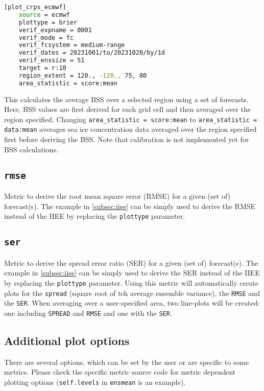 \documentclass[DIV=10, parskip=full]{scrreprt}
\newcommand{\notimplement}[1]{#1}
\begin{document}
\begin{lstlisting}[language=bash]
	[plot_crps_ecmwf]
	source = ecmwf
	plottype = brier
	verif_expname = 0001
	verif_mode = fc
	verif_fcsystem = medium-range
	verif_dates = 20231001/to/20231020/by/1d
	verif_enssize = 51
	target = r:10
	region_extent = 120., -120., 75, 80
	area_statistic = score:mean
\end{lstlisting}
This calculates the average BSS over a selected region using a set of forecasts. Here, BSS values are first derived for each grid cell and then averaged over the region specified. Changing \texttt{area\_statistic = score:mean} to \texttt{area\_statistic = data:mean}  averages sea ice concentration data averaged over the region specified first before deriving the BSS.  \notimplement{Note that calibration is not implemented yet for BSS calculations.}


\subsection{\texttt{rmse}}
Metric to derive the root mean square error (RMSE) for a given (set of) forecast(s). The example in \ref{subsec:iiee} can be simply used to derive the RMSE instead of the IIEE by replacing the \texttt{plottype} parameter. 

\subsection{\texttt{ser}}
Metric to derive the spread error ratio (SER) for a given (set of) forecast(s). The example in \ref{subsec:iiee} can be simply used to derive the SER instead of the IIEE by replacing the \texttt{plottype} parameter. Using this metric will automatically create plots for the \texttt{spread} (square root of teh average ensemble variance), the \texttt{RMSE} and the \texttt{SER}. When averaging over a user-specified area, two line-plots will be created: one including \texttt{SPREAD} and \texttt{RMSE} and one with the \texttt{SER}.



\subsection{Additional plot options}\label{subsec:add_options}
There are several options, which can be set by the user or are specific to some metrics. Please check the specific metric source code for metric dependent plotting options (\texttt{self.levels} in \texttt{ensmean} is an example).\\
\end{document}
